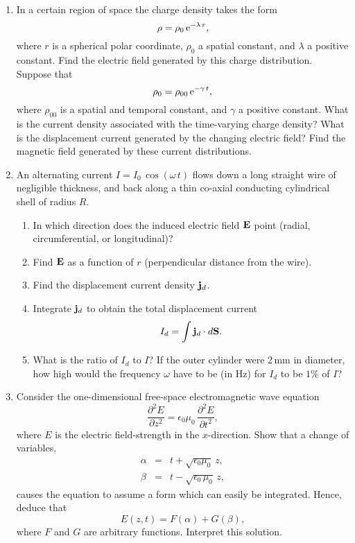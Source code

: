 {\begin{enumerate}
in the wire is
$$
V = \frac{\mu_0}{2\pi}\frac{N\,A}{a}\,\frac{dI}{dt}.
$$
\item In a certain region of space the charge density takes the form 
$$
\rho = \rho_0\,{\rm e}^{-\lambda\,r},
$$
where $r$ is a spherical polar coordinate, $\rho_0$ a spatial constant, and
$\lambda$ a positive constant. Find the electric field generated by this
charge distribution. Suppose that
$$
\rho_0 = \rho_{00}\,{\rm e}^{-\gamma\,t},
$$
where $\rho_{00}$ is a spatial and temporal constant, and $\gamma$
a positive constant. What is the current density associated with the time-varying charge density? What is the displacement current generated by the changing electric field? Find the magnetic field generated by these
current distributions.
\item An alternating current $I=I_0\,\cos(\omega\,t)$ flows down a long
straight wire of negligible thickness, and back along a thin co-axial conducting cylindrical shell of radius $R$.
\begin{enumerate}
\item In which direction does the induced electric field ${\bf E}$ point (radial, circumferential, or longitudinal)?
\item  Find ${\bf E}$ as a function of $r$ (perpendicular distance from the wire).
\item Find the displacement current density ${\bf j}_d$.
\item Integrate ${\bf j}_d$ to obtain the total displacement current
$$
I_d = \int {\bf j}_d\cdot d{\bf S}.
$$
\item What is the ratio of $I_d$ to $I$? If the outer cylinder were 2\,mm
in diameter, how high would the frequency $\omega$ have to be (in Hz)
for $I_d$ to be $1\%$ of $I$?
\end{enumerate}
\item Consider the one-dimensional free-space electromagnetic wave equation
$$
\frac{\partial^2 E}{\partial z^2} = \epsilon_0\mu_0\,\frac{\partial^2 E}{\partial t^2},
$$
where $E$ is the electric field-strength in the $x$-direction. Show that a change
of variables,
\begin{eqnarray}
\alpha &=& t + \sqrt{\epsilon_0\mu_0}\,z,\nonumber\\[0.5ex]
\beta &=& t-\sqrt{\epsilon_0\,\mu_0}\,z,\nonumber
\end{eqnarray}
causes the equation to assume a form which can easily be integrated.
Hence, deduce that
$$
E(z,t) = F(\alpha) + G(\beta),
$$
where $F$ and $G$ are arbitrary functions. Interpret this solution.

\end{enumerate}}
